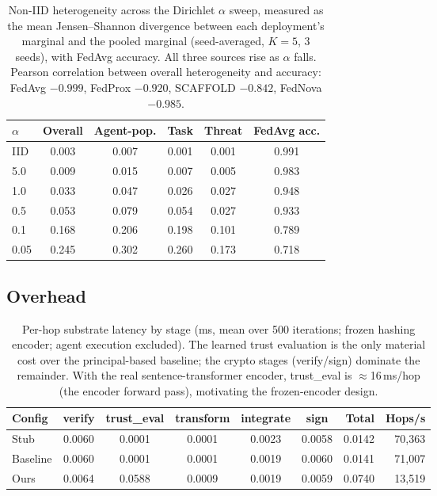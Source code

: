 \documentclass[sigconf,nonacm]{acmart}
\begin{document}
\begin{table}[h]
\caption{Non-IID heterogeneity across the Dirichlet $\alpha$ sweep, measured as the mean Jensen--Shannon divergence between each deployment's marginal and the pooled marginal (seed-averaged, $K{=}5$, 3 seeds), with FedAvg accuracy. All three sources rise as $\alpha$ falls. Pearson correlation between overall heterogeneity and accuracy: FedAvg $-0.999$, FedProx $-0.920$, SCAFFOLD $-0.842$, FedNova $-0.985$.}
\label{tab:heterogeneity}
\centering
\begin{tabular}{lccccc}
\toprule
$\alpha$ & Overall & Agent-pop. & Task & Threat & FedAvg acc. \\
\midrule
IID  & 0.003 & 0.007 & 0.001 & 0.001 & 0.991 \\
5.0  & 0.009 & 0.015 & 0.007 & 0.005 & 0.983 \\
1.0  & 0.033 & 0.047 & 0.026 & 0.027 & 0.948 \\
0.5  & 0.053 & 0.079 & 0.054 & 0.027 & 0.933 \\
0.1  & 0.168 & 0.206 & 0.198 & 0.101 & 0.789 \\
0.05 & 0.245 & 0.302 & 0.260 & 0.173 & 0.718 \\
\bottomrule
\end{tabular}
\end{table}

\subsection{Overhead}


\begin{table}[h]
\caption{Per-hop substrate latency by stage (ms, mean over 500 iterations; frozen hashing encoder; agent execution excluded). The learned trust evaluation is the only material cost over the principal-based baseline; the crypto stages (verify/sign) dominate the remainder. With the real sentence-transformer encoder, trust\_eval is $\approx$16\,ms/hop (the encoder forward pass), motivating the frozen-encoder design.}
\label{tab:overhead}
\centering
\begin{tabular}{lcccccrr}
\toprule
Config & verify & trust\_eval & transform & integrate & sign & Total & Hops/s \\
\midrule
Stub & 0.0060 & 0.0001 & 0.0001 & 0.0023 & 0.0058 & 0.0142 & 70{,}363 \\
Baseline & 0.0060 & 0.0001 & 0.0001 & 0.0019 & 0.0060 & 0.0141 & 71{,}007 \\
Ours & 0.0064 & 0.0588 & 0.0009 & 0.0019 & 0.0059 & 0.0740 & 13{,}519 \\
\bottomrule
\end{tabular}
\end{table}
\end{document}
